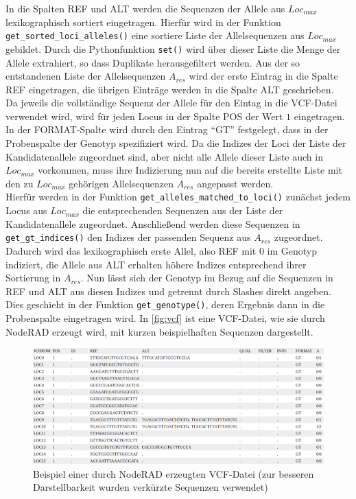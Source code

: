 In die Spalten REF und ALT werden die Sequenzen der Allele aus $Loc_{max}$ lexikographisch sortiert eingetragen. Hierfür wird in der Funktion \lstinline|get_sorted_loci_alleles()| eine sortiere Liste der Allelsequenzen aus $Loc_{max}$ gebildet. Durch die Pythonfunktion \lstinline|set()| wird über dieser Liste die Menge der Allele extrahiert, so dass Duplikate herausgefiltert werden. Aus der so entstandenen Liste der Allelsequenzen $A_{res}$ wird der erste Eintrag in die Spalte REF eingetragen, die übrigen Einträge werden in die Spalte ALT geschrieben.\\

Da jeweils die vollständige Sequenz der Allele für den Eintag in die VCF-Datei verwendet wird, wird für jeden Locus in der Spalte POS der Wert $1$ eingetragen. \\

In der FORMAT-Spalte wird durch den Eintrag ``GT'' festgelegt, dass in der Probenspalte der Genotyp spezifiziert wird. Da die Indizes der Loci der Liste der Kandidatenallele zugeordnet sind, aber nicht alle Allele dieser Liste auch in $Loc_{max}$ vorkommen, muss ihre Indizierung nun auf die bereits erstellte Liste mit den zu $Loc_{max}$ gehörigen Allelsequenzen $A_{res}$ angepasst werden. \\

Hierfür werden in der Funktion \lstinline|get_alleles_matched_to_loci()| zunächst jedem Locus aus $Loc_{max}$ die entsprechenden Sequenzen aus der Liste der Kandidatenallele zugeordnet. Anschließend werden diese Sequenzen in \lstinline|get_gt_indices()| den Indizes der passenden Sequenz aus $A_{res}$ zugeordnet. Dadurch wird das lexikographisch erste Allel, also REF mit 0 im Genotyp indiziert, die Allele aus ALT erhalten höhere Indizes entsprechend ihrer Sortierung in $A_{res}$. Nun lässt sich der Genotyp im Bezug auf die Sequenzen in REF und ALT aus diesen Indizes und getrennt durch Slashes direkt angeben. Dies geschieht in der Funktion \lstinline|get_genotype()|, deren Ergebnis dann in die Probenspalte eingetragen wird. In \autoref{fig:vcf} ist eine VCF-Datei, wie sie durch NodeRAD erzeugt wird, mit kurzen beispielhaften Sequenzen dargestellt. \\
\begin{figure}[H]
	\includegraphics[width=\textwidth]{bilder/vcf/vcf.png}
	\caption{Beispiel einer durch NodeRAD erzeugten VCF-Datei (zur besseren Darstellbarkeit wurden  verkürzte Sequenzen verwendet)}
	\label{fig:vcf}
\end{figure}
\let\cleardoublepage\clearpage

